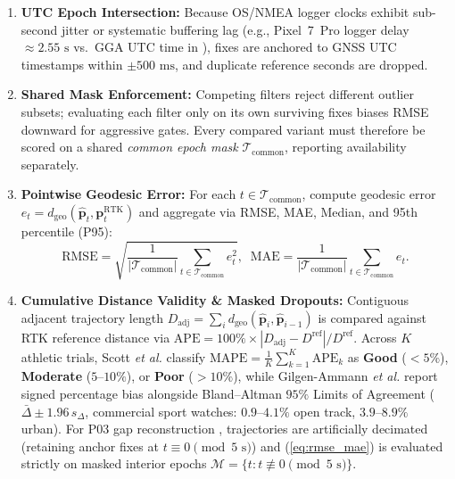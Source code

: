 \documentclass[journal]{IEEEtran}
\begin{document}
\begin{enumerate}
  \item \textbf{UTC Epoch Intersection:} Because OS/NMEA logger clocks exhibit sub-second jitter or systematic buffering lag (e.g., Pixel~7~Pro logger delay $\approx 2.55\text{ s}$ vs.\ GGA UTC time in \cite{tuwien2025dataset}), fixes are anchored to GNSS UTC timestamps within $\pm 500\text{ ms}$, and duplicate reference seconds are dropped.
  \item \textbf{Shared Mask Enforcement:} Competing filters reject different outlier subsets; evaluating each filter only on its own surviving fixes biases RMSE downward for aggressive gates. Every compared variant must therefore be scored on a shared \emph{common epoch mask} $\mathcal{T}_{\text{common}}$, reporting availability separately.
  \item \textbf{Pointwise Geodesic Error:} For each $t \in \mathcal{T}_{\text{common}}$, compute geodesic error $e_t = d_{\text{geo}}(\hat{\mathbf{p}}_t, \mathbf{p}_t^{\text{RTK}})$ and aggregate via RMSE, MAE, Median, and 95th percentile (P95):
\begin{equation}
  \mathrm{RMSE} = \sqrt{\frac{1}{|\mathcal{T}_{\text{common}}|}\sum_{t \in \mathcal{T}_{\text{common}}} e_t^2}, \;\;
  \mathrm{MAE} = \frac{1}{|\mathcal{T}_{\text{common}}|}\sum_{t \in \mathcal{T}_{\text{common}}} e_t.
  \label{eq:rmse_mae}
\end{equation}
  \item \textbf{Cumulative Distance Validity \& Masked Dropouts:} Contiguous adjacent trajectory length $D_{\text{adj}} = \sum_i d_{\text{geo}}(\hat{\mathbf{p}}_i, \hat{\mathbf{p}}_{i-1})$ is compared against RTK reference distance via $\mathrm{APE} = 100\% \times |D_{\text{adj}} - D^{\text{ref}}|/D^{\text{ref}}$. Across $K$ athletic trials, Scott \emph{et al.} \cite{scott2016validity} classify $\mathrm{MAPE} = \frac{1}{K}\sum_{k=1}^K \mathrm{APE}_k$ as \textbf{Good} ($<5\%$), \textbf{Moderate} ($5\text{--}10\%$), or \textbf{Poor} ($>10\%$), while Gilgen-Ammann \emph{et al.} \cite{gilgenammann2020wrist} report signed percentage bias alongside Bland--Altman $95\%$ Limits of Agreement ($\bar{\Delta} \pm 1.96\,s_{\Delta}$, commercial sport watches: $0.9\text{--}4.1\%$ open track, $3.9\text{--}8.9\%$ urban). For P03 gap reconstruction \cite{czerwinski2026reconstruction}, trajectories are artificially decimated (retaining anchor fixes at $t \equiv 0 \pmod{5\text{ s}}$) and (\ref{eq:rmse_mae}) is evaluated strictly on masked interior epochs $\mathcal{M} = \{t : t \not\equiv 0 \pmod{5\text{ s}}\}$.
\end{enumerate}
\end{document}
